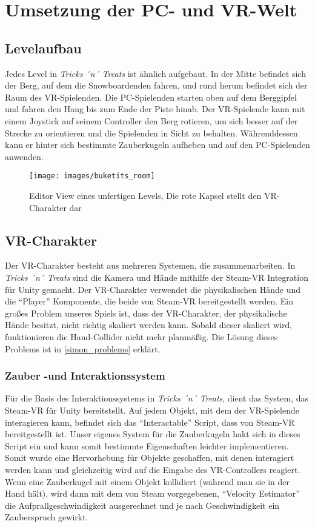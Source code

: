 \chapter{Umsetzung der PC- und VR-Welt}
\section{Levelaufbau}
Jedes Level in \emph{Tricks ´n´ Treats} ist ähnlich aufgebaut. 
In der Mitte befindet sich der Berg, auf dem die Snowboardenden fahren, und rund herum befindet sich der Raum des VR-Spielenden. Die PC-Spielenden starten oben auf dem Berggipfel und fahren den Hang bis zum Ende der Piste hinab. Der VR-Spielende kann mit einem Joystick auf seinem Controller den Berg rotieren, um sich besser auf der Strecke zu orientieren und die Spielenden in Sicht zu behalten. Währenddessen kann er hinter sich bestimmte Zauberkugeln aufheben und auf den PC-Spielenden anwenden.


\begin{figure}[H]
	\centering
	\texttt{[image: images/buketits\_room]}
	\caption{Editor View eines unfertigen Levels, Die rote Kapsel stellt den VR-Charakter dar}
\end{figure}

\section{VR-Charakter} \label{simon_vrspieler}
Der VR-Charakter besteht aus mehreren Systemen, die zusammenarbeiten. In \emph{Tricks ´n´ Treats} sind die Kamera und Hände mithilfe der Steam-VR Integration für Unity gemacht. Der VR-Charakter verwendet die physikalischen Hände und die "`Player"' Komponente, die beide von Steam-VR bereitgestellt werden. Ein großes Problem unseres Spiels ist, dass der VR-Charakter, der physikalische Hände besitzt, nicht richtig skaliert werden kann. Sobald dieser skaliert wird, funktionieren die Hand-Collider nicht mehr planmäßig. Die Lösung dieses Problems ist in \ref{simon_problems} erklärt.

\subsection{Zauber -und Interaktionssystem}
Für die Basis des Interaktionssystems in \emph{Tricks ´n´ Treats}, dient das System, das Steam-VR für Unity bereitstellt. Auf jedem Objekt, mit dem der VR-Spielende interagieren kann, befindet sich das "`Interactable"' Script, dass von Steam-VR bereitgestellt ist. Unser eigenes System für die Zauberkugeln hakt sich in dieses Script ein und kann somit bestimmte Eigenschaften leichter implementieren. Somit wurde eine Hervorhebung für Objekte geschaffen, mit denen interagiert werden kann und gleichzeitig wird auf die Eingabe des VR-Controllers reagiert. Wenn eine Zauberkugel mit einem Objekt kollidiert (während man sie in der Hand hält), wird dann mit dem von Steam vorgegebenen, "`Velocity Estimator"' die Aufprallgeschwindigkeit ausgerechnet und je nach Geschwindigkeit ein Zauberspruch gewirkt.

